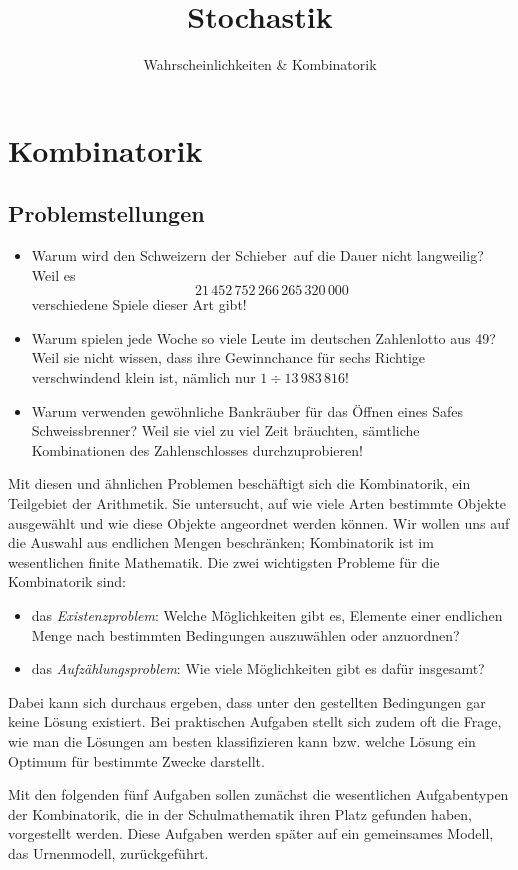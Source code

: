 \documentclass[%
11pt,%
twoside,%
titlepage,%
german,%
headsepline%
]{scrartcl}
\title{Stochastik}
\subtitle{Wahrscheinlichkeiten \& Kombinatorik}
\author{}
\date{}
\newcommand{\definition}[1]{\colorbox{emerald}{#1}}
\begin{document}
\clearpage

\appendix

\section{Kombinatorik}
\subsection{Problemstellungen}
\begin{itemize}
\item Warum wird den Schweizern der \glqq Schieber\grqq\ auf die Dauer nicht langweilig? Weil es
$$21\,452\,752\,266\,265\,320\,000$$
verschiedene Spiele dieser Art gibt!
\item Warum spielen jede Woche so viele Leute im deutschen Zahlenlotto  aus 49\grqq?
Weil sie nicht wissen, dass ihre Gewinnchance für sechs Richtige verschwindend klein ist, nämlich nur $1\div13\,983\,816$!
\item Warum verwenden gewöhnliche Bankräuber für das Öffnen eines Safes Schweissbrenner?
Weil sie viel zu viel Zeit bräuchten, sämtliche Kombinationen des Zahlenschlosses durchzuprobieren!
\end{itemize}

Mit diesen und ähnlichen Problemen beschäftigt sich die \definition{Kombinatorik}, ein Teilgebiet der Arithmetik. Sie untersucht, auf wie viele Arten bestimmte Objekte ausgewählt und wie diese Objekte angeordnet werden können. Wir wollen uns auf die Auswahl aus endlichen Mengen beschränken; Kombinatorik ist im wesentlichen finite Mathematik. Die zwei wichtigsten Probleme für die Kombinatorik sind:
\begin{itemize}
\item das \emph{Existenzproblem}: Welche Möglichkeiten gibt es, Elemente einer endlichen Menge nach bestimmten Bedingungen auszuwählen oder anzuordnen?
\item das \emph{Aufzählungsproblem}: Wie viele Möglichkeiten gibt es dafür insgesamt?
\end{itemize}

Dabei kann sich durchaus ergeben, dass unter den gestellten Bedingungen gar keine Lösung existiert. Bei praktischen Aufgaben stellt sich zudem oft die Frage, wie man die Lösungen am besten klassifizieren kann bzw. welche Lösung ein Optimum für bestimmte Zwecke darstellt.

Mit den folgenden fünf Aufgaben sollen zunächst die wesentlichen Aufgabentypen der Kombinatorik, die in der Schulmathematik ihren Platz gefunden haben, vorgestellt werden. Diese Aufgaben werden später auf ein gemeinsames Modell, das Urnenmodell, zurückgeführt.
\end{document}
